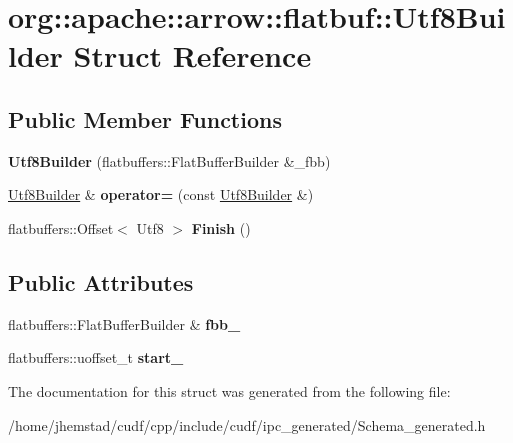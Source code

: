 \hypertarget{structorg_1_1apache_1_1arrow_1_1flatbuf_1_1Utf8Builder}{}\section{org\+:\+:apache\+:\+:arrow\+:\+:flatbuf\+:\+:Utf8\+Builder Struct Reference}
\label{structorg_1_1apache_1_1arrow_1_1flatbuf_1_1Utf8Builder}
\subsection*{Public Member Functions}
\begin{DoxyCompactItemize}
\item 
{\bfseries Utf8\+Builder} (flatbuffers\+::\+Flat\+Buffer\+Builder \&\+\_\+fbb)\hypertarget{structorg_1_1apache_1_1arrow_1_1flatbuf_1_1Utf8Builder_a2bbb8ad8276640ba7a7d8f1132bc2ee5}{}\label{structorg_1_1apache_1_1arrow_1_1flatbuf_1_1Utf8Builder_a2bbb8ad8276640ba7a7d8f1132bc2ee5}

\item 
\hyperlink{structorg_1_1apache_1_1arrow_1_1flatbuf_1_1Utf8Builder}{Utf8\+Builder} \& {\bfseries operator=} (const \hyperlink{structorg_1_1apache_1_1arrow_1_1flatbuf_1_1Utf8Builder}{Utf8\+Builder} \&)\hypertarget{structorg_1_1apache_1_1arrow_1_1flatbuf_1_1Utf8Builder_a82ed3a1c7d546833725e778b6f3b0f34}{}\label{structorg_1_1apache_1_1arrow_1_1flatbuf_1_1Utf8Builder_a82ed3a1c7d546833725e778b6f3b0f34}

\item 
flatbuffers\+::\+Offset$<$ Utf8 $>$ {\bfseries Finish} ()\hypertarget{structorg_1_1apache_1_1arrow_1_1flatbuf_1_1Utf8Builder_a276b1e761a24be3bc794ec1e0eba884e}{}\label{structorg_1_1apache_1_1arrow_1_1flatbuf_1_1Utf8Builder_a276b1e761a24be3bc794ec1e0eba884e}

\end{DoxyCompactItemize}
\subsection*{Public Attributes}
\begin{DoxyCompactItemize}
\item 
flatbuffers\+::\+Flat\+Buffer\+Builder \& {\bfseries fbb\+\_\+}\hypertarget{structorg_1_1apache_1_1arrow_1_1flatbuf_1_1Utf8Builder_aed8d58c8353643009278de110f7b4aca}{}\label{structorg_1_1apache_1_1arrow_1_1flatbuf_1_1Utf8Builder_aed8d58c8353643009278de110f7b4aca}

\item 
flatbuffers\+::uoffset\+\_\+t {\bfseries start\+\_\+}\hypertarget{structorg_1_1apache_1_1arrow_1_1flatbuf_1_1Utf8Builder_ab1d57c6bd9962db61eee7eaba6e849cf}{}\label{structorg_1_1apache_1_1arrow_1_1flatbuf_1_1Utf8Builder_ab1d57c6bd9962db61eee7eaba6e849cf}

\end{DoxyCompactItemize}


The documentation for this struct was generated from the following file\+:\begin{DoxyCompactItemize}
\item 
/home/jhemstad/cudf/cpp/include/cudf/ipc\+\_\+generated/Schema\+\_\+generated.\+h\end{DoxyCompactItemize}
